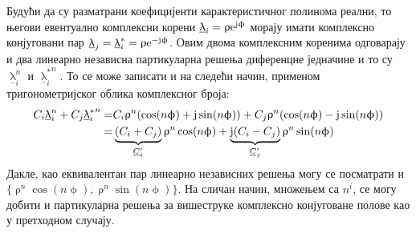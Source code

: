 Будући да су разматрани коефицијенти карактеристичног
полинома реални, то његови евентуално комплексни корени  
$\underline{\uplambda}_i = \uprho {\rm e}^{{\rm j}\upphi}$ морају имати комплексно 
конјуговани пар $\underline{\uplambda}_j=\underline{\uplambda}_i^* 
= \uprho {\rm e}^{-{\rm j}\upphi}$. Овим двома 
комплексним коренима одговарају и два линеарно независна
партикуларна решења диференцне једначине и то су 
$\underline{\uplambda}_i^n$ и 
${\underline{\uplambda}_i^*}^n$. То се 
може записати и на следећи начин, применом тригонометријског облика комплексног 
броја:
\begin{align}
C_i \underline{\uplambda}_i^n
+ C_j {\underline{\uplambda}_i^*}^n =& 
C_i \uprho^n(\cos(n\upphi) + 
{\rm j}\sin(n\upphi)) 
+ C_j \uprho^n(\cos(n\upphi) - 
{\rm j}\sin(n\upphi)) \\
=& \underbrace{(C_i + C_j)}_{\underline C_i'} \uprho^n \cos(n\upphi) + 
\underbrace{ {\rm j}(C_i - C_j)}_{\underline C_j'}\uprho^n \sin(n\upphi) \label{recttrig}
\end{align}
Дакле, као еквивалентан пар линеарно независних 
решења могу се посматрати и $\{\uprho^n \cos(n\upphi), 
\uprho^n \sin(n\upphi)\}$. На сличан начин, 
множењем са $n^i$, се 
могу добити и партикуларна решења за вишеструке 
комплексно конјуговане полове као у претходном случају.


